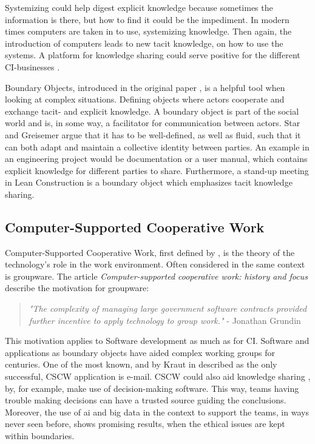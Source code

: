 Systemizing could help digest explicit knowledge because sometimes the information is there, but how to find it could be the impediment. In modern times computers are taken in to use, systemizing knowledge. Then again, the introduction of computers leads to new tacit knowledge, on how to use the systems. A platform for knowledge sharing could serve positive for the different CI-businesses \cite{kivrak2008capturing}. 

Boundary Objects, introduced in the original paper \cite{star&griesemer}, is a helpful tool when looking at complex situations. Defining objects where actors cooperate and exchange tacit- and explicit knowledge. A boundary object is part of the social world and is, in some way, a facilitator for communication between actors. Star and Greisemer argue that it has to be well-defined, as well as fluid, such that it can both adapt and maintain a collective identity between parties. An example in an engineering project would be documentation or a user manual, which contains explicit knowledge for different parties to share. Furthermore, a stand-up meeting in Lean Construction is a boundary object which emphasizes tacit knowledge sharing.

\subsection{Computer-Supported Cooperative Work}
Computer-Supported Cooperative Work, first defined by \cite{Friedman}, is the theory of the technology's role in the work environment. Often considered in the same context is groupware. The article \textit{Computer-supported cooperative work: history and focus} \cite{Grudin} describe the motivation for groupware: 
\begin{quotation}
    \noindent \textit{"The complexity of managing large government software contracts provided further incentive to apply technology to group work."} - Jonathan Grundin
\end{quotation}
This motivation applies to Software development as much as for CI. Software and applications as boundary objects have aided complex working groups for centuries. One of the most known, and by Kraut in \cite{Kraut} described as the only successful, CSCW application is e-mail. CSCW could also aid knowledge sharing \cite{monplaisir2002enhancing}, by, for example, make use of decision-making software. This way, teams having trouble making decisions can have a trusted source guiding the conclusions. Moreover, the use of ai and big data in the context to support the teams, in ways never seen before, shows promising results, when the ethical issues \cite{jung2017computational} are kept within boundaries.

